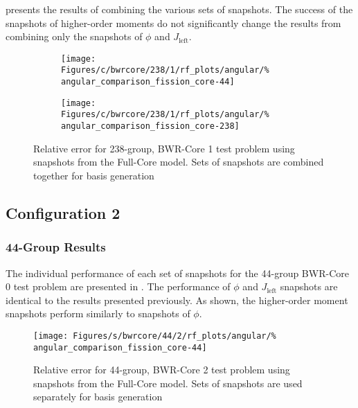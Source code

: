  presents the results of combining the 
various sets of snapshots.  The success of the snapshots of higher-order 
moments do not significantly change the results from combining only the 
snapshots of $\phi$ and $J_{\text{left}}$.

\begin{figure*}[tb]
    \centering
    \begin{subfigure}{0.5\textwidth}
        \centering
        \texttt{[image: Figures/c/bwrcore/238/1/rf\_plots/angular/\%
            angular\_comparison\_fission\_core-44]}
    \end{subfigure}%
    \begin{subfigure}{0.5\textwidth}
        \centering
        \texttt{[image: Figures/c/bwrcore/238/1/rf\_plots/angular/\%
            angular\_comparison\_fission\_core-238]}
    \end{subfigure}
    \caption{Relative error for 238-group, BWR-Core 1 test problem using 
        snapshots from the Full-Core model.  Sets of snapshots are combined 
        together for basis generation}
    \label{fig:BWR1-core-combined-238}
\end{figure*}

\subsection{Configuration 2}

\subsubsection{44-Group Results}

The individual performance of each set of snapshots for the 44-group BWR-Core 0
test problem are presented in .  The 
performance of $\phi$ and $J_{\text{left}}$ snapshots are 
identical to the results presented previously.  As shown, the higher-order 
moment snapshots perform similarly to snapshots of $\phi$.

\begin{figure*}[tb]
    \centering
    \texttt{[image: Figures/s/bwrcore/44/2/rf\_plots/angular/\%
        angular\_comparison\_fission\_core-44]}
    \caption{Relative error for 44-group, BWR-Core 2 test problem using 
        snapshots from the Full-Core model.  Sets of snapshots are 
        used separately for basis generation}
    \label{fig:BWR2-core-single}
\end{figure*}

